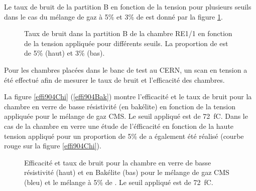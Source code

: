  Le taux de bruit de la partition B en fonction de la tension pour plusieurs seuils dans le cas du mélange de gaz à 5\% et 3\% de  est donné par la figure \ref{bruitB2}.
  
\begin{figure}[ht!]
	\centering
	\hfill
	\caption{Taux de bruit dans la partition B de la chambre RE1/1 en fonction de la tension appliquée pour différents seuils. La proportion de  est de 5\% (haut) et 3\% (bas).}
    \label{bruitB2}
\end{figure}  
  
Pour les chambres placées dans le banc de test au CERN, un scan en tension a été effectué afin de mesurer le taux de bruit et l'efficacité des chambres.

La figure \ref{effi904Chi} (\ref{effi904Bak}) montre l'efficacité et le taux de bruit pour la chambre en verre de basse résistivité (en bakélite) en fonction de la tension appliquée pour le mélange de gaz CMS. Le seuil appliqué est de \SI{72}{\femto\coulomb}. Dans le cas de la chambre en verre une étude de l'éfficacité en fonction de la haute tension appliqué pour un proportion de 5\% de  a également été réalisé (courbe rouge sur la figure \ref{effi904Chi}).
 
\begin{figure}[ht!]
	\centering
	\hfill
	\caption{Efficacité et taux de bruit pour la chambre en verre de basse résistivité (haut) et en Bakélite (bas) pour le mélange de gaz CMS (bleu) et le mélange à 5\% de . Le seuil appliqué est de \SI{72}{\femto\coulomb}.}
\end{figure}  

